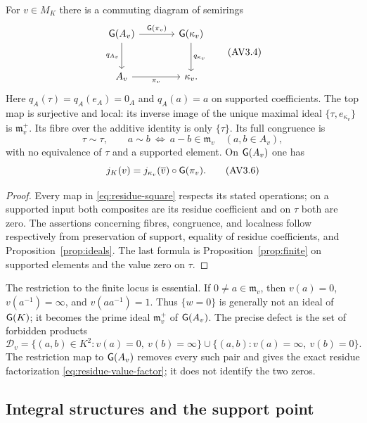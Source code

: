 \begin{theorem}\label{thm:residue}
For $v\in M_K$ there is a commuting diagram of semirings
\[
\begin{tikzcd}[column sep=large,row sep=large]
 \G(A_v) \arrow[r,"\G(\pi_v)"] \arrow[d,"q_{A_v}"'] &
 \G(\kappa_v) \arrow[d,"q_{\kappa_v}"]\\
 A_v \arrow[r,"\pi_v"'] & \kappa_v .
\end{tikzcd}
\tag{AV3.4}\label{eq:residue-square}
\]
Here $q_A(\tau)=q_A(e_A)=0_A$ and $q_A(a)=a$ on supported coefficients.
The top map is surjective and local: its inverse image of the unique
maximal ideal $\{\tau,e_{\kappa_v}\}$ is
$\mathfrak m_v^+$. Its fibre over the additive identity is only $\{\tau\}$.
Its full congruence is
\[
 \tau\sim\tau,\qquad
 a\sim b\ \Longleftrightarrow\ a-b\in\mathfrak m_v
 \quad(a,b\in A_v),
 \tag{AV3.5}\label{eq:residue-congruence}
\]
with no equivalence of $\tau$ and a supported element.
On $\mathsf G(A_v)$ one has
\[
 j_K(v)=j_{\kappa_v}(\overline v)\circ\mathsf G(\pi_v).
 \tag{AV3.6}\label{eq:residue-value-factor}
\]
\end{theorem}
\begin{proof}
Every map in \eqref{eq:residue-square} respects its stated operations;
on a supported input both composites are its residue coefficient and
on $\tau$ both are zero. The assertions concerning fibres, congruence,
and localness follow respectively from preservation of support, equality
of residue coefficients, and Proposition~\ref{prop:ideals}.
The last formula is Proposition~\ref{prop:finite} on supported elements
and the value zero on $\tau$.
\end{proof}

The restriction to the finite locus is essential. If $0\ne a\in
\mathfrak m_v$, then $v(a)=0$, $v(a^{-1})=\infty$, and $v(aa^{-1})=1$.
Thus $\{w=0\}$ is generally not an ideal of $\mathsf G(K)$; it becomes the
prime ideal $\mathfrak m_v^+$ of $\mathsf G(A_v)$. The precise defect is the set
of forbidden products
\[
 \mathcal D_v=\{(a,b)\in K^2:v(a)=0,\ v(b)=\infty\}
 \cup\{(a,b):v(a)=\infty,\ v(b)=0\}.
\]
The restriction map to $\mathsf G(A_v)$ removes every such pair and gives the
exact residue factorization \eqref{eq:residue-value-factor}; it does not
identify the two zeros.

\subsection{Integral structures and the support point}

